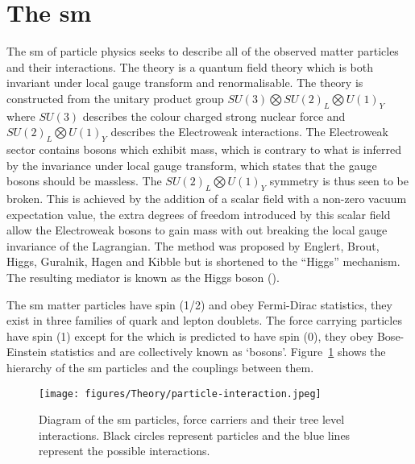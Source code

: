 \section{The \ac{sm}} %
\label{sec:the_standard_model_sm_}

The \ac{sm} of particle physics 
\cite{Glashow1961579,PhysRevLett.19.1264,tHooft1972189} seeks to describe all 
of the observed matter particles and their interactions. The theory is a 
quantum field theory which is both invariant under local gauge transform and 
renormalisable. The theory is constructed from the unitary product group
$SU(3)\bigotimes SU(2)_{L} \bigotimes U(1)_{Y}$ where $SU(3)$ describes the
colour charged strong nuclear force and $SU(2)_{L} \bigotimes U(1)_{Y}$
describes the Electroweak interactions. The Electroweak sector contains 
bosons which exhibit mass, which is contrary to what is inferred by the
invariance under local gauge transform, which states that the gauge bosons 
should be massless. The $SU(2)_{L} \bigotimes U(1)_{Y}$ symmetry is thus seen 
to be broken. This is achieved by the addition of a scalar field with a 
non-zero vacuum expectation value, the extra degrees of freedom introduced by 
this scalar field allow the Electroweak bosons to gain mass with out breaking 
the local gauge invariance of the Lagrangian. The method was proposed by 
Englert, Brout, Higgs, Guralnik, Hagen and Kibble 
\cite{tHooft1972189,PhysRevLett.13.321,Higgs1964132,PhysRevLett.13.508,PhysRevLett.13.585,PhysRev.145.1156,PhysRev.155.1554} but 
is shortened to the ``Higgs'' mechanism. The resulting mediator is known as
the Higgs boson (\PHiggs).

The \ac{sm} matter particles have spin (1/2) and obey Fermi-Dirac statistics,
they exist in three families of quark and lepton doublets. The force carrying
particles have spin (1) except for the \PHiggs which is predicted to have spin
(0), they obey Bose-Einstein statistics and are collectively known as `bosons'.
Figure~\ref{fig:figures_Theory_particle-interaction} shows the hierarchy of the
\ac{sm} particles and the couplings between them.

\begin{figure}[htbp]
  \centering
    \texttt{[image: figures/Theory/particle-interaction.jpeg]}
  \caption{Diagram of the \ac{sm} particles, force carriers and their tree 
  level interactions. Black circles represent particles and the blue lines 
  represent the possible interactions.\cite{wikiParticleInteractions}}
  \label{fig:figures_Theory_particle-interaction}
\end{figure}

